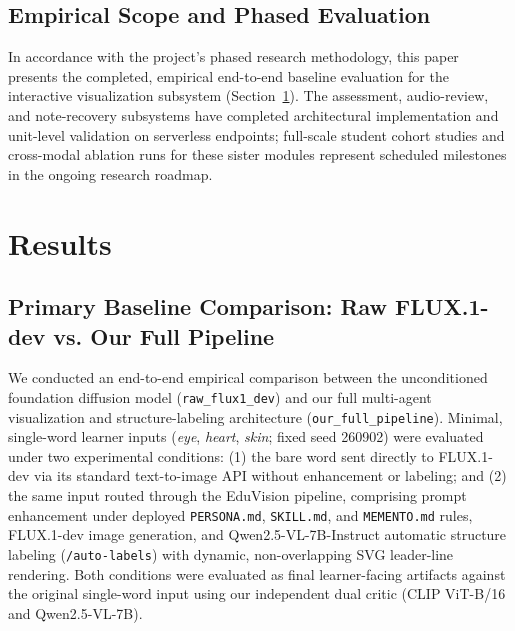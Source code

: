 \documentclass[conference]{IEEEtran}
\begin{document}
\subsection{Empirical Scope and Phased Evaluation}
\label{sec:gaps}

In accordance with the project's phased research methodology, this paper presents the completed, empirical end-to-end baseline evaluation for the interactive visualization subsystem (Section~\ref{sec:results}). The assessment, audio-review, and note-recovery subsystems have completed architectural implementation and unit-level validation on serverless endpoints; full-scale student cohort studies and cross-modal ablation runs for these sister modules represent scheduled milestones in the ongoing research roadmap.

\section{Results}
\label{sec:results}

\subsection{Primary Baseline Comparison: Raw FLUX.1-dev vs. Our Full Pipeline}
\label{sec:pilot}

We conducted an end-to-end empirical comparison between the unconditioned foundation diffusion model (\texttt{raw\_flux1\_dev}) and our full multi-agent visualization and structure-labeling architecture (\texttt{our\_full\_pipeline}). Minimal, single-word learner inputs (\textit{eye}, \textit{heart}, \textit{skin}; fixed seed 260902) were evaluated under two experimental conditions: (1) the bare word sent directly to FLUX.1-dev via its standard text-to-image API without enhancement or labeling; and (2) the same input routed through the EduVision pipeline, comprising prompt enhancement under deployed \texttt{PERSONA.md}, \texttt{SKILL.md}, and \texttt{MEMENTO.md} rules, FLUX.1-dev image generation, and Qwen2.5-VL-7B-Instruct automatic structure labeling (\texttt{/auto-labels}) with dynamic, non-overlapping SVG leader-line rendering. Both conditions were evaluated as final learner-facing artifacts against the original single-word input using our independent dual critic (CLIP ViT-B/16 and Qwen2.5-VL-7B).
\end{document}
